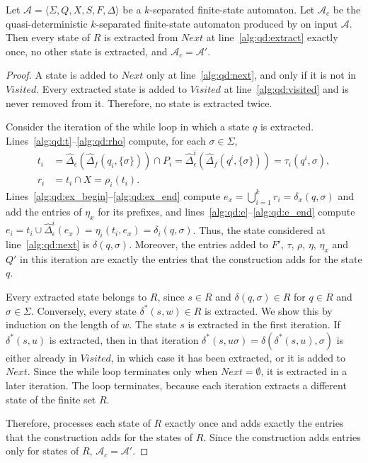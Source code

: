   \begin{proposition}\label{prop:quasidet_algorithm}
    Let $\mathcal{A} = \langle \Sigma, Q, X, S, F, \Delta \rangle$ be a
    $k$-separated finite-state automaton. Let $\mathcal{A}_c$ be the
    quasi-deterministic $k$-separated finite-state automaton produced by
     on input $\mathcal{A}$. Then every state of $R$ is
    extracted from $Next$ at line~\ref{alg:qd:extract} exactly once, no other state is
    extracted, and $\mathcal{A}_c = \mathcal{A}'$.
  \end{proposition}

  \begin{proof}
    A state is added to $Next$ only at line~\ref{alg:qd:next}, and only if it is not
    in $Visited$. Every extracted state is added to $Visited$ at
    line~\ref{alg:qd:visited} and is never removed from it. Therefore, no state is
    extracted twice.

    Consider the iteration of the while loop in which a state $q$ is extracted.
    Lines~\ref{alg:qd:t}--\ref{alg:qd:rho} compute, for each $\sigma \in \Sigma$,
    \begin{align*}
      t_i &= \hat{\Delta}_\epsilon(\hat{\Delta}_f(q_i, \{ \sigma \})) \cap P_i =
      \hat{\Delta}_\epsilon^i(\hat{\Delta}_f(q^i, \{ \sigma \})) = \tau_i(q^i,
      \sigma),\\
      r_i &= t_i \cap X = \rho_i(t_i).
    \end{align*}
    Lines~\ref{alg:qd:ex_begin}--\ref{alg:qd:ex_end} compute $e_x = \bigcup_{i=1}^k
    r_i = \delta_x(q, \sigma)$ and add the entries of $\eta_x$ for its prefixes, and
    lines~\ref{alg:qd:e}--\ref{alg:qd:e_end} compute $e_i = t_i \cup
    \hat{\Delta}_\epsilon^i(e_x) = \eta_i(t_i, e_x) = \delta_i(q, \sigma)$. Thus, the
    state considered at line~\ref{alg:qd:next} is $\delta(q, \sigma)$. Moreover, the
    entries added to $F'$, $\tau$, $\rho$, $\eta$, $\eta_x$ and $Q'$ in this iteration
    are exactly the entries that the construction adds for the state $q$.

    Every extracted state belongs to $R$, since $s \in R$ and $\delta(q, \sigma) \in R$
    for $q \in R$ and $\sigma \in \Sigma$. Conversely, every state $\delta^*(s, w) \in
    R$ is extracted. We show this by induction on the length of $w$. The state $s$ is
    extracted in the first iteration. If $\delta^*(s, u)$ is extracted, then in that
    iteration $\delta^*(s, u\sigma) = \delta(\delta^*(s, u), \sigma)$ is either already
    in $Visited$, in which case it has been extracted, or it is added to $Next$. Since
    the while loop terminates only when $Next = \emptyset$, it is extracted in a later
    iteration. The loop terminates, because each iteration extracts a different state of
    the finite set $R$.

    Therefore,  processes each state of $R$ exactly once and
    adds exactly the entries that the construction adds for the states of $R$. Since
    the construction adds entries only for states of $R$, $\mathcal{A}_c =
    \mathcal{A}'$.
  \end{proof}

